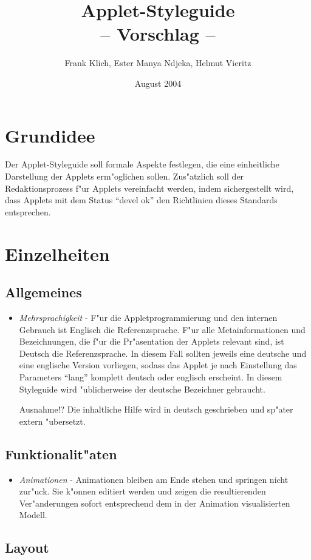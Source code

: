 \documentclass[a4paper,12pt]{article}
\title{Applet-Styleguide \\ -- Vorschlag --}
\author{Frank Klich, Ester Manya Ndjeka, Helmut Vieritz}
\date{August 2004}
\begin{document}
\maketitle

\section{Grundidee}
Der Applet-Styleguide soll formale Aspekte festlegen, die eine einheitliche
Darstellung der Applets erm"oglichen sollen. Zus"atzlich soll der Redaktionsprozess f"ur
Applets vereinfacht werden, indem sichergestellt wird, dass Applets mit dem Status
"`devel ok"' den Richtlinien dieses Standards entsprechen.

\section{Einzelheiten}
\subsection{Allgemeines}
\begin{itemize}
\item \textit{Mehrsprachigkeit} - F"ur die Appletprogrammierung und den internen Gebrauch
  ist Englisch die Referenzsprache. F"ur alle Metainformationen und Bezeichnungen, die f"ur
  die Pr"asentation der Applets relevant sind, ist Deutsch die Referenzsprache. In diesem
  Fall sollten jeweils eine deutsche und eine englische Version vorliegen, sodass das Applet
  je nach Einstellung das Parameters "`lang"' komplett deutsch oder englisch erscheint. In
  diesem Styleguide wird "ublicherweise der deutsche Bezeichner gebraucht.

Ausnahme!? Die inhaltliche Hilfe wird in deutsch geschrieben und sp"ater extern "ubersetzt. 

\end{itemize}

\subsection{Funktionalit"aten}
\begin{itemize}
\item \textit{Animationen} - Animationen bleiben am Ende stehen und springen nicht zur"uck.
  Sie k"onnen editiert werden und zeigen die resultierenden Ver"anderungen sofort
  entsprechend dem in der Animation visualisierten Modell.
\end{itemize}
\subsection{Layout}
\end{document}
